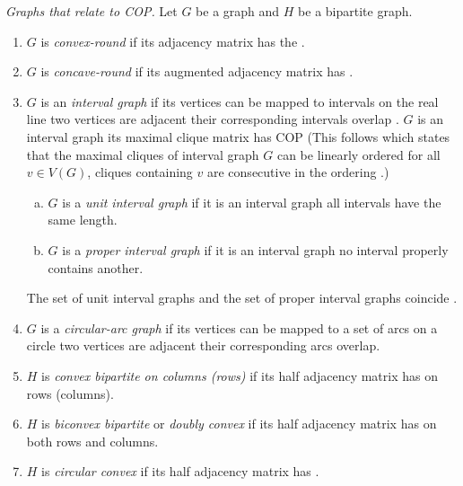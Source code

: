 \begin{definition}{\emph{Graphs that relate to
      COP.\cite[Def.~2.5]{d08phd}}} %
  \label{def:graphwithcop} %
  Let $G$ be a graph and $H$ be a bipartite graph.
  \begin{enumerate}
  \item $G$ is \emph{convex-round} if its adjacency matrix has the
    \CROP.
  \item \label{def::concave-round} $G$ is \emph{concave-round} if its
    augmented adjacency matrix has \CROP. 
  \item $G$ is an \emph{interval graph} if its vertices can be mapped
    to intervals on the real line \stt two vertices are adjacent \iff
    their corresponding intervals overlap .  $G$ is an interval graph \iff its maximal clique matrix
    has COP \cite{fg65} (This follows \cite{gh64} which states
      that the maximal cliques of interval graph $G$ can be linearly
      ordered \stt for all $v \in V(G)$, cliques containing $v$ are
      consecutive in the ordering \cite[Th. 8.1]{mcg04}.)
    \begin{enumerate}[a.]
    \item $G$ is a \emph{unit interval graph} if it is an interval
      graph \stt all intervals have the same length.
    \item $G$ is a \emph{proper interval graph} if it is an interval
      graph \stt no interval properly contains another.
    \end{enumerate}
    The set of unit interval graphs and the set of proper interval
    graphs coincide \cite{rob69, gar07}.
 \item $G$ is a \emph{circular-arc graph} if its vertices can be
    mapped to a set of arcs on a circle \stt two vertices are adjacent
    \iff their corresponding arcs overlap.
  \item $H$ is \emph{convex bipartite on columns (rows)} if its half
    adjacency matrix has \COP on rows (columns).%
    \label{def::convexbi}
  \item $H$ is \emph{biconvex bipartite} or \emph{doubly
      convex}\cite{yc95} if its half adjacency matrix has \COP on both
    rows and columns.
  \item $H$ is \emph{circular convex} if its half adjacency matrix has
    \CROP.
  \end{enumerate}
\end{definition}

